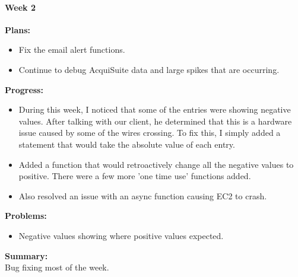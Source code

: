 \paragraph{Week 2}
\begin{adjustwidth}{2.5em}{0pt}
    \vspace{-0.5cm}\textbf{Plans:}
    \vspace{-0.5cm}
    \begin{itemize}
        \item Fix the email alert functions.
        \item Continue to debug AcquiSuite data and large spikes that are occurring.
    \end{itemize} 
    \vspace{-0.3cm}\textbf{Progress:}
    \vspace{-0.5cm}
    \begin{itemize}
        \item During this week, I noticed that some of the entries were showing negative values. After talking with our client, he determined that this is a hardware issue caused by some of the wires crossing. To fix this, I simply added a statement that would take the absolute value of each entry. 
		\item Added a function that would retroactively change all the negative values to positive. There were a few more 'one time use' functions added. 
		\item Also resolved an issue with an async function causing EC2 to crash.
    \end{itemize} 
    \vspace{-0.3cm}\textbf{Problems:}
    \vspace{-0.5cm}
    \begin{itemize}
        \item Negative values showing where positive values expected.
    \end{itemize}  
    \vspace{-0.3cm}\noindent\textbf{Summary:}\\
    \noindent Bug fixing most of the week. 
\end{adjustwidth} 
